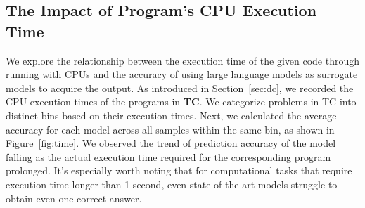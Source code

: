 \begin{table}[!h]
\caption{Model Performance by Difficulty Level in the CL Subset}
\label{tab:cl}
\end{table}

\subsection{The Impact of Program's CPU Execution Time}

We explore the relationship between the execution time of the given code through running with CPUs and the accuracy of using large language models as surrogate models to acquire the output. As introduced in Section~\ref{sec:dc}, we recorded the CPU execution times of the programs in \textbf{TC}. We categorize problems in TC into distinct bins based on their execution times. Next, we calculated the average accuracy for each model across all samples within the same bin, as shown in Figure~\ref{fig:time}. We observed the trend of prediction accuracy of the model falling as the actual execution time required for the corresponding program prolonged. It's especially worth noting that for computational tasks that require execution time longer than 1 second, even state-of-the-art models struggle to obtain even one correct answer.

